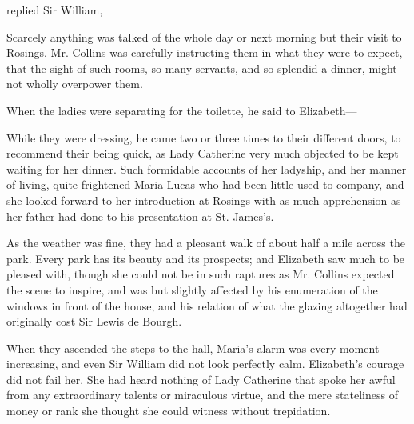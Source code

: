  replied Sir William, 

Scarcely anything was talked of the whole day or next morning but their visit to Rosings. Mr. Collins was carefully instructing them in what they were to expect, that the sight of such rooms, so many servants, and so splendid a dinner, might not wholly overpower them.

When the ladies were separating for the toilette, he said to Elizabeth---


While they were dressing, he came two or three times to their different doors, to recommend their being quick, as Lady Catherine very much objected to be kept waiting for her dinner. Such formidable accounts of her ladyship, and her manner of living, quite frightened Maria Lucas who had been little used to company, and she looked forward to her introduction at Rosings with as much apprehension as her father had done to his presentation at St. James's.

As the weather was fine, they had a pleasant walk of about half a mile across the park. Every park has its beauty and its prospects; and Elizabeth saw much to be pleased with, though she could not be in such raptures as Mr. Collins expected the scene to inspire, and was but slightly affected by his enumeration of the windows in front of the house, and his relation of what the glazing altogether had originally cost Sir Lewis de Bourgh.

When they ascended the steps to the hall, Maria's alarm was every moment increasing, and even Sir William did not look perfectly calm. Elizabeth's courage did not fail her. She had heard nothing of Lady Catherine that spoke her awful from any extraordinary talents or miraculous virtue, and the mere stateliness of money or rank she thought she could witness without trepidation.

